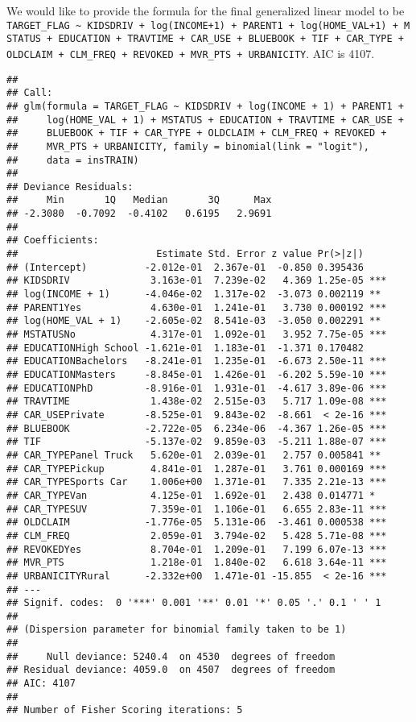 \documentclass[]{article}
\begin{document}
We would like to provide the formula for the final generalized linear
model to be
\texttt{TARGET\_FLAG\ \textasciitilde{}\ KIDSDRIV\ +\ log(INCOME+1)\ +\ PARENT1\ +\ log(HOME\_VAL+1)\ +\ MSTATUS\ +\ EDUCATION\ +\ TRAVTIME\ +\ CAR\_USE\ +\ BLUEBOOK\ +\ TIF\ +\ CAR\_TYPE\ +\ OLDCLAIM\ +\ CLM\_FREQ\ +\ REVOKED\ +\ MVR\_PTS\ +\ URBANICITY}.
AIC is 4107.

\begin{verbatim}
## 
## Call:
## glm(formula = TARGET_FLAG ~ KIDSDRIV + log(INCOME + 1) + PARENT1 + 
##     log(HOME_VAL + 1) + MSTATUS + EDUCATION + TRAVTIME + CAR_USE + 
##     BLUEBOOK + TIF + CAR_TYPE + OLDCLAIM + CLM_FREQ + REVOKED + 
##     MVR_PTS + URBANICITY, family = binomial(link = "logit"), 
##     data = insTRAIN)
## 
## Deviance Residuals: 
##     Min       1Q   Median       3Q      Max  
## -2.3080  -0.7092  -0.4102   0.6195   2.9691  
## 
## Coefficients:
##                        Estimate Std. Error z value Pr(>|z|)    
## (Intercept)          -2.012e-01  2.367e-01  -0.850 0.395436    
## KIDSDRIV              3.163e-01  7.239e-02   4.369 1.25e-05 ***
## log(INCOME + 1)      -4.046e-02  1.317e-02  -3.073 0.002119 ** 
## PARENT1Yes            4.630e-01  1.241e-01   3.730 0.000192 ***
## log(HOME_VAL + 1)    -2.605e-02  8.541e-03  -3.050 0.002291 ** 
## MSTATUSNo             4.317e-01  1.092e-01   3.952 7.75e-05 ***
## EDUCATIONHigh School -1.621e-01  1.183e-01  -1.371 0.170482    
## EDUCATIONBachelors   -8.241e-01  1.235e-01  -6.673 2.50e-11 ***
## EDUCATIONMasters     -8.845e-01  1.426e-01  -6.202 5.59e-10 ***
## EDUCATIONPhD         -8.916e-01  1.931e-01  -4.617 3.89e-06 ***
## TRAVTIME              1.438e-02  2.515e-03   5.717 1.09e-08 ***
## CAR_USEPrivate       -8.525e-01  9.843e-02  -8.661  < 2e-16 ***
## BLUEBOOK             -2.722e-05  6.234e-06  -4.367 1.26e-05 ***
## TIF                  -5.137e-02  9.859e-03  -5.211 1.88e-07 ***
## CAR_TYPEPanel Truck   5.620e-01  2.039e-01   2.757 0.005841 ** 
## CAR_TYPEPickup        4.841e-01  1.287e-01   3.761 0.000169 ***
## CAR_TYPESports Car    1.006e+00  1.371e-01   7.335 2.21e-13 ***
## CAR_TYPEVan           4.125e-01  1.692e-01   2.438 0.014771 *  
## CAR_TYPESUV           7.359e-01  1.106e-01   6.655 2.83e-11 ***
## OLDCLAIM             -1.776e-05  5.131e-06  -3.461 0.000538 ***
## CLM_FREQ              2.059e-01  3.794e-02   5.428 5.71e-08 ***
## REVOKEDYes            8.704e-01  1.209e-01   7.199 6.07e-13 ***
## MVR_PTS               1.218e-01  1.840e-02   6.618 3.64e-11 ***
## URBANICITYRural      -2.332e+00  1.471e-01 -15.855  < 2e-16 ***
## ---
## Signif. codes:  0 '***' 0.001 '**' 0.01 '*' 0.05 '.' 0.1 ' ' 1
## 
## (Dispersion parameter for binomial family taken to be 1)
## 
##     Null deviance: 5240.4  on 4530  degrees of freedom
## Residual deviance: 4059.0  on 4507  degrees of freedom
## AIC: 4107
## 
## Number of Fisher Scoring iterations: 5
\end{verbatim}
\end{document}
